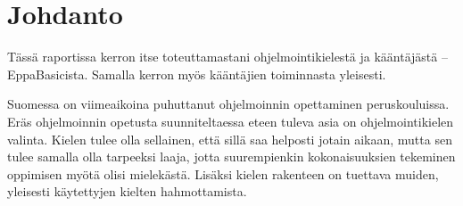 
\section{Johdanto}
\begin{comment}
Tietokoneet ymmärtävät konekieltä.
Konekieli muodostuu yksinkertaisisista komennoista,
joiden nopeaan suorittamiseen tietokoneet on suunniteltu.
Ihmiset ovat kuitenkin huonoja kirjoittamaan konekieltä
sen alkukantaisten komentojen vuoksi.
Ihmisiä varten onkin kehitelty erilaisia ohjelmointikieliä,
jotka sisältävät erilaisia abstraktioita ohjelmoinnin helpottamiseksi.

Muunnos ohjelmointikielestä konekieleen ei kuitenkaan aina ole yksinkertainen.
Monet ohjelmointikielten abstraktiot voidaan toteuttaa hyvinkin eri tavoin konekielessä,
sillä eri tietokonearkkitehtuurit sisältävät hyvinkin erilaisia konekielisiä komentoja.
Lisäksi lyhyistäkin ohjelmakoodinpätkistä voi syntyä pitkiä konekielisiä ohjelmia,
joten pientenkin ohjelmien muuttaminen konekieleksi voi viedä ohjelmoijalta tunteja.

Tämän prosessin automatisoimiseksi on kehitetty ohjelmia, joita kutsutaan kääntäjiksi.
Kääntäjä on yksinkertaisesti ohjelma, joka muuttaa koodia muodosta toiseen.
Usein tämä tarkoittaa ohjelmointikielen muuttamista konekieleksi,
mutta on myös olemassa kääntäjiä,
jotka kääntävät ohjelmointikieliä toisikseen.
Tällaisia kääntäjiä kutsutaan source-to-source-kääntäjiksi.
\end{comment}

Tässä raportissa kerron itse toteuttamastani
ohjelmointikielestä ja kääntäjästä -- EppaBasicista.
Samalla kerron myös kääntäjien toiminnasta yleisesti.


Suomessa on viimeaikoina puhuttanut ohjelmoinnin
opettaminen peruskouluissa.
Eräs ohjelmoinnin opetusta suunniteltaessa eteen tuleva
asia on ohjelmointikielen valinta.
Kielen tulee olla sellainen,
että sillä saa helposti jotain aikaan,
mutta sen tulee samalla olla tarpeeksi laaja,
jotta suurempienkin kokonaisuuksien tekeminen
oppimisen myötä olisi mielekästä.
Lisäksi kielen rakenteen on tuettava muiden,
yleisesti käytettyjen kielten hahmottamista.

